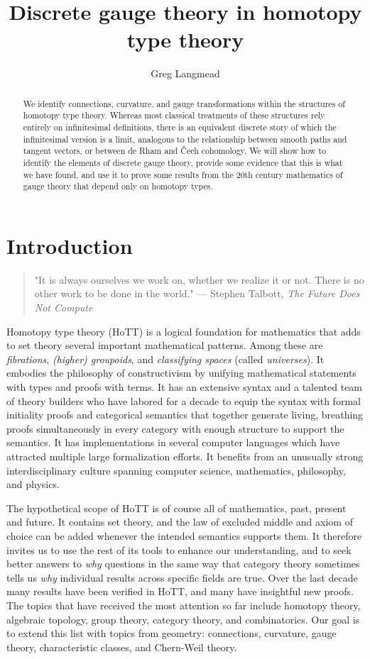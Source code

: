 \documentclass[12pt]{article}
\title{Discrete gauge theory in homotopy type theory}
\author{Greg Langmead}
\begin{document}
\begin{abstract}
We identify connections, curvature, and gauge transformations within the structures of homotopy type theory. Whereas most classical treatments of these structures rely entirely on infinitesimal definitions, there is an equivalent discrete story of which the infinitesimal version is a limit, analogous to the relationship between smooth paths and tangent vectors, or between de Rham and Čech cohomology. We will show how to identify the elements of discrete gauge theory, provide some evidence that this is what we have found, and use it to prove some results from the 20th century mathematics of gauge theory that depend only on homotopy types.
\end{abstract}


\section{Introduction}
\begin{quote} 
\centering 
"It is always ourselves we work on, whether we realize it or not. There is no other work to be done in the world." --- Stephen Talbott, \emph{The Future Does Not Compute}\cite{talbott}
\end{quote}

Homotopy type theory (HoTT) is a logical foundation for mathematics that adds to set theory several important mathematical patterns. Among these are \emph{fibrations}, \emph{(higher) groupoids}, and \emph{classifying spaces} (called \emph{universes}). It embodies the philosophy of constructivism by unifying mathematical statements with types and proofs with terms. It has an extensive syntax and a talented team of theory builders who have labored for a decade to equip the syntax with formal initiality proofs and categorical semantics that together generate living, breathing proofs simultaneously in every category with enough structure to support the semantics. It has implementations in several computer languages which have attracted multiple large formalization efforts. It benefits from an unusually strong interdisciplinary culture spanning computer science, mathematics, philosophy, and physics.

The hypothetical scope of HoTT is of course all of mathematics, past, present and future. It contains set theory, and the law of excluded middle and axiom of choice can be added whenever the intended semantics supports them. It therefore invites us to use the rest of its tools to enhance our understanding, and to seek better answers to \emph{why} questions in the same way that category theory sometimes tells us \emph{why} individual results across specific fields are true. Over the last decade many results have been verified in HoTT, and many have insightful new proofs. The topics that have received the most attention so far include homotopy theory, algebraic topology, group theory, category theory, and combinatorics. Our goal is to extend this list with topics from geometry: connections, curvature, gauge theory, characteristic classes, and Chern-Weil theory.
\end{document}
